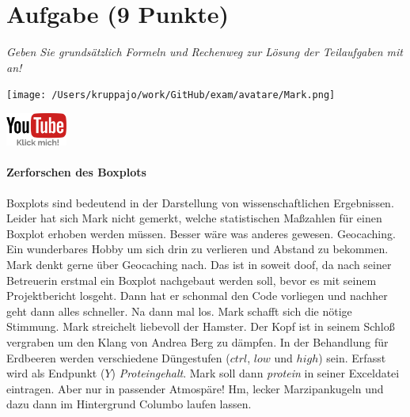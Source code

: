 \documentclass[a4paper, 9pt]{scrartcl}\usepackage[]{graphicx}\usepackage[]{xcolor}
\begin{document}
\section{Aufgabe \hfill (9 Punkte)}

\textit{Geben Sie grundsätzlich Formeln und Rechenweg zur Lösung der Teilaufgaben mit an!} \\[1Ex]
 

 
\begin{minipage}[t]{0.5\textwidth}
\texttt{[image: /Users/kruppajo/work/GitHub/exam/avatare/Mark.png]}
\end{minipage}
\begin{minipage}[t]{0.5\textwidth}
\hfill
\href{https://youtu.be/Xf0yE-o7bEU}{\includegraphics[width = 2cm]{img/youtube}}
\end{minipage}
\vspace{-3ex}



\paragraph{Zerforschen des Boxplots}

Boxplots sind bedeutend in der Darstellung von wissenschaftlichen Ergebnissen. Leider hat sich Mark nicht gemerkt, welche statistischen Maßzahlen für einen Boxplot erhoben werden müssen. Besser wäre was anderes gewesen. Geocaching. Ein wunderbares Hobby um sich drin zu verlieren und Abstand zu bekommen. Mark denkt gerne über Geocaching nach. Das ist in soweit doof, da nach seiner Betreuerin erstmal ein Boxplot nachgebaut werden soll, bevor es mit seinem Projektbericht losgeht. Dann hat er schonmal den \Rlogo Code vorliegen und nachher geht dann alles schneller. Na dann mal los. Mark schafft sich die nötige Stimmung. Mark streichelt liebevoll der Hamster. Der Kopf ist in seinem Schloß vergraben um den Klang von Andrea Berg zu dämpfen. In der Behandlung für Erdbeeren werden verschiedene Düngestufen ($ctrl$, $low$ und $high$) sein. Erfasst wird als Endpunkt ($Y$) \textit{Proteingehalt}. Mark soll dann \textit{protein} in seiner Exceldatei eintragen. Aber nur in passender Atmospäre! Hm, lecker Marzipankugeln und dazu dann im Hintergrund Columbo laufen lassen.
\end{document}
